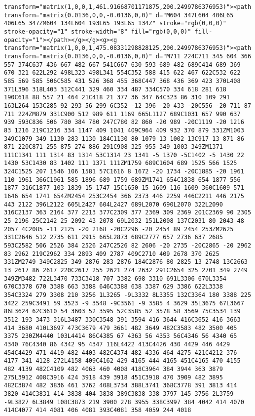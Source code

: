 \documentclass[
]{article}
\begin{document}
\begin{verbatim}
transform="matrix(1,0,0,1,461.91668701171875,200.2499786376953)"><path transform="matrix(0.0136,0,0,-0.0136,0,0)" d="M604 347L604 406L65 406L65 347ZM604 134L604 193L65 193L65 134Z" stroke="rgb(0,0,0)" stroke-opacity="1" stroke-width="8" fill="rgb(0,0,0)" fill-opacity="1"></path></g></g><g><g transform="matrix(1,0,0,1,475.08331298828125,200.2499786376953)"><path transform="matrix(0.0136,0,0,-0.0136,0,0)" d="M711 224C711 345 604 366 557 374C637 436 667 482 667 541C667 630 593 689 482 689C414 689 369 670 321 622L292 498L323 498L341 554C352 588 415 622 467 622C532 622 585 569 585 506C585 431 526 368 455 368C447 368 436 369 423 370L408 371L396 318L403 312C441 329 460 334 487 334C570 334 618 281 618 190C618 88 557 21 464 21C418 21 377 36 347 64C323 86 310 109 291 163L264 153C285 92 293 56 299 6C352 -12 396 -20 433 -20C556 -20 711 87 711 224ZM879 331C900 512 989 611 1169 665L1127 689C1031 657 990 637 939 593C836 506 780 384 780 247C780 82 860 -20 989 -20C1119 -20 1216 83 1216 219C1216 334 1147 409 1041 409C964 409 932 370 879 331ZM1003 349C1079 349 1130 283 1130 184C1130 80 1079 13 1002 13C917 13 871 86 871 220C871 255 875 274 886 291C908 325 955 349 1003 349ZM1371 111C1341 111 1314 83 1314 53C1314 23 1341 -5 1370 -5C1402 -5 1430 22 1430 53C1430 83 1402 111 1371 111ZM1759 689C1604 689 1525 566 1525 324C1525 207 1546 106 1581 57C1616 8 1672 -20 1734 -20C1885 -20 1961 110 1961 366C1961 585 1896 689 1759 689ZM1741 654C1838 654 1877 556 1877 316C1877 103 1839 15 1747 15C1650 15 1609 116 1609 360C1609 571 1646 654 1741 654ZM2454 253C2454 366 2373 446 2259 446C2211 446 2175 443 2122 396L2122 605L2427 604L2427 689L2070 690L2070 322L2090 316C2137 363 2164 377 2213 377C2309 377 2369 309 2369 201C2369 90 2305 25 2196 25C2142 25 2092 43 2078 69L2032 151L2008 137C2031 80 2043 48 2057 4C2085 -11 2125 -20 2168 -20C2296 -20 2454 89 2454 253ZM2625 331C2646 512 2735 611 2915 665L2873 689C2777 657 2736 637 2685 593C2582 506 2526 384 2526 247C2526 82 2606 -20 2735 -20C2865 -20 2962 83 2962 219C2962 334 2893 409 2787 409C2710 409 2678 370 2625 331ZM2749 349C2825 349 2876 283 2876 184C2876 80 2825 13 2748 13C2663 13 2617 86 2617 220C2617 255 2621 274 2632 291C2654 325 2701 349 2749 349ZM3482 722L3470 733C3418 707 3382 698 3310 691L3306 670L3354 670C3378 670 3388 663 3388 646C3388 638 3387 629 3386 622L3338 354C3324 279 3308 210 3256 1L3265 -9L3332 8L3355 132C3364 180 3388 225 3422 259C3491 59 3523 -9 3548 -9C3561 -9 3585 4 3629 35L3675 67L3667 86L3624 62C3610 54 3603 52 3595 52C3585 52 3578 58 3569 75C3534 139 3512 193 3473 316L3487 330C3548 391 3594 416 3644 416C3652 416 3663 414 3680 410L3697 473C3679 479 3661 482 3649 482C3583 482 3500 405 3375 230ZM4440 103L4414 86C4385 67 4363 56 4353 56C4346 56 4340 65 4340 76C4340 86 4342 95 4347 116L4422 413C4426 430 4429 446 4429 454C4429 471 4419 482 4403 482C4374 482 4336 464 4275 421C4212 376 4177 341 4128 272L4158 409C4162 429 4165 444 4165 451C4165 470 4155 482 4139 482C4109 482 4063 460 4008 418C3964 384 3944 363 3879 275L3912 408C3916 424 3918 439 3918 451C3918 470 3909 482 3895 482C3874 482 3836 461 3762 408L3734 388L3741 368C3778 391 3813 414 3820 414C3831 414 3838 404 3838 389C3838 338 3797 145 3756 2L3759 -9L3827 6L3849 108C3873 219 3900 278 3955 338C3997 384 4042 414 4070 414C4077 414 4081 406 4081 393C4081 358 4059 244 4018 
\end{verbatim}
\end{document}
